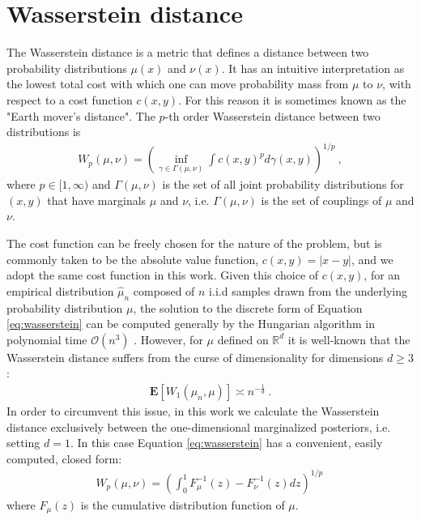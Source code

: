 \documentclass[fleqn,usenatbib,useAMS]{mnras}
\begin{document}
\section{Wasserstein distance}\label{sec:wasserstein}
The Wasserstein distance is a metric that defines a distance between two probability distributions $\mu(x)$ and $\nu(x)$. It has an intuitive interpretation as the lowest total cost with which one can move probability mass from $\mu$ to $\nu$, with respect to a cost function $c(x,y)$. For this reason it is sometimes known as the "Earth mover's distance". The $p$-th order Wasserstein distance between two distributions is
\begin{eqnarray}
	W_p(\mu,\nu)= \left( \inf_{\gamma \in \Gamma(\mu, \nu)}  \int c(x,y)^p d \gamma (x,y)\right)^{1/p} \label{eq:wasserstein} \ ,
\end{eqnarray}
where $p \in [1,\infty)$ and $\Gamma(\mu, \nu)$ is the set of all joint probability distributions for $(x,y)$ that have marginals $\mu$ and $\nu$, i.e. $\Gamma(\mu, \nu)$ is the set of couplings of $\mu$ and $\nu$. \newline 


The cost function can be freely chosen for the nature of the problem, but is commonly taken to be the absolute value function, $c(x,y) = |x-y|$, and we adopt the same cost function in this work. Given this choice of $c(x,y)$, for an empirical distribution $\hat{\mu}_n$ composed of $n$ i.i.d samples drawn from the underlying probability distribution $\mu$, the solution to the discrete form of Equation \eqref{eq:wasserstein} can be computed generally by the Hungarian algorithm \citep{Kuhn} in polynomial time $\mathcal{O}(n^3)$ \citep{Villani2009}. However, for $\mu$ defined on $\mathbb{R}^d$ it is well-known \citep{Dudley} that the Wasserstein distance suffers from the curse of dimensionality for dimensions $d \geq 3$:
\begin{eqnarray}
	\boldsymbol{E} [W_1(\hat{\mu}_n,\mu)] \asymp n^{-\frac{1}{d}} \ .
\end{eqnarray}
In order to circumvent this issue, in this work we calculate the Wasserstein distance exclusively between the one-dimensional marginalized posteriors, i.e. setting $d=1$. In this case Equation \eqref{eq:wasserstein} has a convenient, easily computed, closed form:
\begin{eqnarray}
	W_p(\mu,\nu)= \left(\int_0^1  F_{\mu}^{-1} (z) - F_{\nu}^{-1} (z) dz \right)^{1/p} \, \label{eq:wasserstein}
\end{eqnarray}
where $F_{\mu}(z)$ is the cumulative distribution function of $\mu$. \newline  
\end{document}
